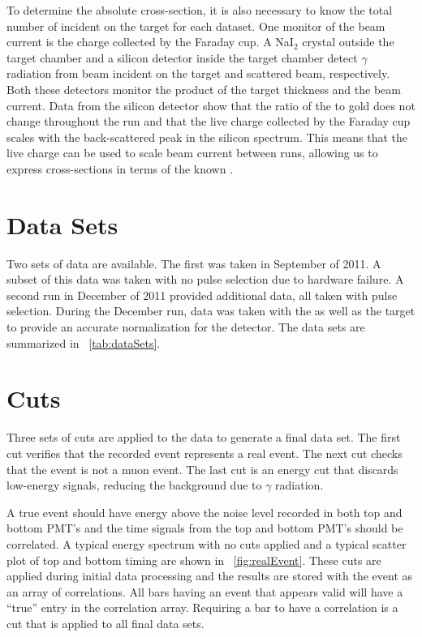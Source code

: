 To determine the absolute cross-section, it is also necessary to know the total number of  incident on the target for each dataset.  One monitor of the beam current is the charge collected by the Faraday cup.  A NaI$_2$ crystal outside the target chamber and a silicon detector inside the target chamber detect $\gamma$ radiation from beam incident on the target and scattered  beam, respectively.  Both these detectors monitor the product of the target thickness and the beam current.  Data from the silicon detector show that the ratio of the \GeTargets to gold does not change throughout the run and that the live charge collected by the Faraday cup scales with the back-scattered peak in the silicon spectrum.  This means that the live charge can be used to scale beam current between runs, allowing us to express \reaction cross-sections in terms of the known \MgReaction.

\section{Data Sets}
Two sets of \reaction data are available.  The first was taken in September of 2011.  A subset of this data was taken with no pulse selection due to hardware failure.  A second run in December of 2011 provided additional data, all taken with pulse selection.  During the December run, data was taken with the \GeTargets as well as the  target to provide an accurate normalization for the detector.  The data sets are summarized in {\tab}~\ref{tab:dataSets}.

\section{Cuts}
Three sets of cuts are applied to the data to generate a final data set.  The first cut verifies that the recorded event represents a real event.  The next cut checks that the event is not a muon event.  The last cut is an energy cut that discards low-energy signals, reducing the background due to $\gamma$ radiation.

A true event should have energy above the noise level recorded in both top and bottom PMT's and the time signals from the top and bottom PMT's should be correlated.  A typical energy spectrum with no cuts applied and a typical scatter plot of top and bottom timing are shown in {\fig}~\ref{fig:realEvent}.  These cuts are applied during initial data processing and the results are stored with the event as an array of correlations.  All bars having an event that appears valid will have a ``true'' entry in the correlation array.  Requiring a bar to have a correlation is a cut that is applied to all final data sets.

